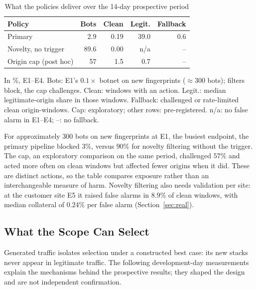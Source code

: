 \documentclass[conference,letterpaper,10pt]{IEEEtran}
\newcommand\1{\textit{(i)}}
\newcommand\2{\textit{(ii)}}
\newcommand\3{\textit{(iii)}}
\newcommand\4{\textit{(iv)}}
\newcommand\5{\textit{(v)}}
\newcommand\6{\textit{(vi)}}
\newcommand\7{\textit{(vii)}}
\newcommand\8{\textit{(viii)}}
\newcommand\9{\textit{(ix)}}
\begin{document}
\begin{table}[!ht]
\centering
\caption{What the policies deliver over the 14-day prospective period}
\label{tab:overview}
\footnotesize
\setlength{\tabcolsep}{2.3pt}
\begin{tabular*}{\columnwidth}{@{\extracolsep{\fill}}lrrrr@{}}
\toprule
\textbf{Policy} & \textbf{Bots} & \textbf{Clean} & \textbf{Legit.} & \textbf{Fallback} \\
\midrule
Primary                  & 2.9  & 0.19 & 39.0 & 0.6 \\
Novelty, no trigger      & 89.6 & 0.00 & n/a  & -- \\
Origin cap (post hoc)    & 57   & 1.5  & 0.7  & -- \\
\bottomrule
\end{tabular*}

\vspace{2pt}
\begin{minipage}{\linewidth}\footnotesize In \%, E1--E4. Bots: E1's $0.1\times$ botnet on new fingerprints ($\approx300$ bots); filters block, the cap challenges. Clean: windows with an action. Legit.: median legitimate-origin share in those windows. Fallback: challenged or rate-limited clean origin-windows. Cap: exploratory; other rows: pre-registered. n/a: no false alarm in E1--E4; --: no fallback.\end{minipage}
\end{table}

For approximately 300 bots on new fingerprints at E1, the busiest endpoint, the primary pipeline blocked $3\%$, versus $90\%$ for novelty filtering without the trigger. The cap, an exploratory comparison on the same period, challenged $57\%$ and acted more often on clean windows but affected fewer origins when it did. These are distinct actions, so the table compares exposure rather than an interchangeable measure of harm. Novelty filtering also needs validation per site: at the customer site E5 it raised false alarms in $8.9\%$ of clean windows, with median collateral of $0.24\%$ per false alarm (Section~\ref{sec:real}).

\subsection{What the Scope Can Select}
\label{sec:symbolic-detector}
\label{sec:fleetfloor}
\label{sec:production}
\label{sec:collateral}
\label{sec:ablation}



Generated traffic isolates selection under a constructed best case: its new stacks never appear in legitimate traffic. The following development-day measurements explain the mechanisms behind the prospective results; they shaped the design and are not independent confirmation.
\end{document}
